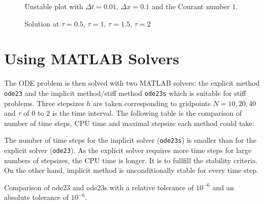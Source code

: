 \documentclass{article}
\begin{document}
\begin{figure}
  \centering
  \caption{Unstable plot with $\Delta t = 0.01$, $\Delta x = 0.1$ and the
    Courant number $1$.}
    \label{unstable_solution}
\end{figure}

\begin{figure}
  \centering
  \caption{Solution at $\tau = 0.5$, $\tau = 1$, $\tau = 1.5$, $\tau = 2$}
    \label{2dplots}
\end{figure}

\section{Using MATLAB Solvers}

The ODE problem is then solved with two MATLAB solvers: the explicit method \texttt{ode23} and the implicit method/stiff method \texttt{ode23s} which is suitable for stiff problems. Three stepsizes $h$ are taken corresponding to gridpoints $N = 10, 20, 40$ and $\tau$ of 0 to 2 is the time interval. The following table is the comparison of number of time steps, CPU time and maximal stepsize each method could take:

The number of time steps for the implicit solver (\texttt{ode23s}) is smaller than for the explicit solver (\texttt{ode23}). As the explicit solver requires more time steps for large numbers of stepsizes, the CPU time is longer. It is to fullfill the stability criteria. On the other hand, implicit method is unconditionally stable for every time step. 
\begin{table}[!h]
 \caption{Comparison of ode23 and ode23s with a relative tolerance of $10^{-6}$ and an absolute tolerance of $10^{-6}$.}
\end{table}
\end{document}
